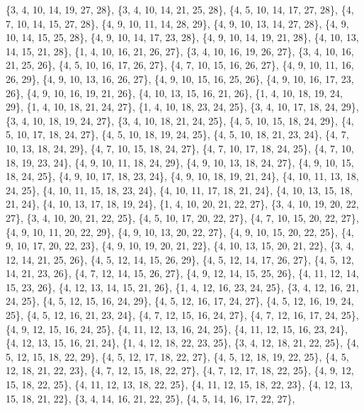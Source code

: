 \documentclass[11pt,a4paper]{article}
\begin{document}
{\{3, 4, 10, 14, 19, 27, 28\}, \{3, 4, 10, 14, 21, 25, 28\}, \{4, 5, 10, 14, 17, 27, 28\}, \{4, 7, 10, 14, 15, 27, 28\}, \{4, 9, 10, 11, 14, 28, 29\},
\{4, 9, 10, 13, 14, 27, 28\}, \{4, 9, 10, 14, 15, 25, 28\}, \{4, 9, 10, 14, 17, 23, 28\}, \{4, 9, 10, 14, 19, 21, 28\}, \{4, 10, 13, 14, 15, 21, 28\},
\{1, 4, 10, 16, 21, 26, 27\}, \{3, 4, 10, 16, 19, 26, 27\}, \{3, 4, 10, 16, 21, 25, 26\}, \{4, 5, 10, 16, 17, 26, 27\}, \{4, 7, 10, 15, 16, 26, 27\},
\{4, 9, 10, 11, 16, 26, 29\}, \{4, 9, 10, 13, 16, 26, 27\}, \{4, 9, 10, 15, 16, 25, 26\}, \{4, 9, 10, 16, 17, 23, 26\}, \{4, 9, 10, 16, 19, 21, 26\},
\{4, 10, 13, 15, 16, 21, 26\}, \{1, 4, 10, 18, 19, 24, 29\}, \{1, 4, 10, 18, 21, 24, 27\}, \{1, 4, 10, 18, 23, 24, 25\}, \{3, 4, 10, 17, 18, 24, 29\},
\{3, 4, 10, 18, 19, 24, 27\}, \{3, 4, 10, 18, 21, 24, 25\}, \{4, 5, 10, 15, 18, 24, 29\}, \{4, 5, 10, 17, 18, 24, 27\}, \{4, 5, 10, 18, 19, 24, 25\},
\{4, 5, 10, 18, 21, 23, 24\}, \{4, 7, 10, 13, 18, 24, 29\}, \{4, 7, 10, 15, 18, 24, 27\}, \{4, 7, 10, 17, 18, 24, 25\}, \{4, 7, 10, 18, 19, 23, 24\},
\{4, 9, 10, 11, 18, 24, 29\}, \{4, 9, 10, 13, 18, 24, 27\}, \{4, 9, 10, 15, 18, 24, 25\}, \{4, 9, 10, 17, 18, 23, 24\}, \{4, 9, 10, 18, 19, 21, 24\},
\{4, 10, 11, 13, 18, 24, 25\}, \{4, 10, 11, 15, 18, 23, 24\}, \{4, 10, 11, 17, 18, 21, 24\}, \{4, 10, 13, 15, 18, 21, 24\}, \{4, 10, 13, 17, 18, 19, 24\},
\{1, 4, 10, 20, 21, 22, 27\}, \{3, 4, 10, 19, 20, 22, 27\}, \{3, 4, 10, 20, 21, 22, 25\}, \{4, 5, 10, 17, 20, 22, 27\}, \{4, 7, 10, 15, 20, 22, 27\},
\{4, 9, 10, 11, 20, 22, 29\}, \{4, 9, 10, 13, 20, 22, 27\}, \{4, 9, 10, 15, 20, 22, 25\}, \{4, 9, 10, 17, 20, 22, 23\}, \{4, 9, 10, 19, 20, 21, 22\},
\{4, 10, 13, 15, 20, 21, 22\}, \{3, 4, 12, 14, 21, 25, 26\}, \{4, 5, 12, 14, 15, 26, 29\}, \{4, 5, 12, 14, 17, 26, 27\}, \{4, 5, 12, 14, 21, 23, 26\},
\{4, 7, 12, 14, 15, 26, 27\}, \{4, 9, 12, 14, 15, 25, 26\}, \{4, 11, 12, 14, 15, 23, 26\}, \{4, 12, 13, 14, 15, 21, 26\}, \{1, 4, 12, 16, 23, 24, 25\},
\{3, 4, 12, 16, 21, 24, 25\}, \{4, 5, 12, 15, 16, 24, 29\}, \{4, 5, 12, 16, 17, 24, 27\}, \{4, 5, 12, 16, 19, 24, 25\}, \{4, 5, 12, 16, 21, 23, 24\},
\{4, 7, 12, 15, 16, 24, 27\}, \{4, 7, 12, 16, 17, 24, 25\}, \{4, 9, 12, 15, 16, 24, 25\}, \{4, 11, 12, 13, 16, 24, 25\}, \{4, 11, 12, 15, 16, 23, 24\},
\{4, 12, 13, 15, 16, 21, 24\}, \{1, 4, 12, 18, 22, 23, 25\}, \{3, 4, 12, 18, 21, 22, 25\}, \{4, 5, 12, 15, 18, 22, 29\}, \{4, 5, 12, 17, 18, 22, 27\},
\{4, 5, 12, 18, 19, 22, 25\}, \{4, 5, 12, 18, 21, 22, 23\}, \{4, 7, 12, 15, 18, 22, 27\}, \{4, 7, 12, 17, 18, 22, 25\}, \{4, 9, 12, 15, 18, 22, 25\},
\{4, 11, 12, 13, 18, 22, 25\}, \{4, 11, 12, 15, 18, 22, 23\}, \{4, 12, 13, 15, 18, 21, 22\}, \{3, 4, 14, 16, 21, 22, 25\}, \{4, 5, 14, 16, 17, 22, 27\},
}
\end{document}
